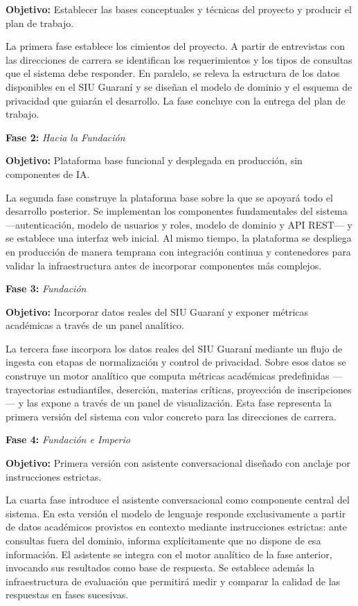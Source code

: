 \documentclass[
  spanish,
]{article}
\begin{document}
\textbf{Objetivo:} Establecer las bases conceptuales y técnicas del proyecto y producir el plan de trabajo.

La primera fase establece los cimientos del proyecto. A partir de entrevistas con las direcciones de carrera
se identifican los requerimientos y los tipos de consultas que el sistema debe responder.
En paralelo, se releva la estructura de los datos disponibles en el SIU Guaraní y se diseñan
el modelo de dominio y el esquema de privacidad que guiarán el desarrollo.
La fase concluye con la entrega del plan de trabajo.

\textbf{Fase 2:} \emph{Hacia la Fundación}

\textbf{Objetivo:} Plataforma base funcional y desplegada en producción, sin componentes de IA.

La segunda fase construye la plataforma base sobre la que se apoyará todo el desarrollo posterior.
Se implementan los componentes fundamentales del sistema ---autenticación, modelo de usuarios y roles,
modelo de dominio y API REST--- y se establece una interfaz web inicial.
Al mismo tiempo, la plataforma se despliega en producción de manera temprana con integración continua
y contenedores para validar la infraestructura antes de incorporar componentes más complejos.

\textbf{Fase 3:} \emph{Fundación}

\textbf{Objetivo:} Incorporar datos reales del SIU Guaraní y exponer métricas académicas a través de un panel analítico.

La tercera fase incorpora los datos reales del SIU Guaraní mediante un flujo de ingesta
con etapas de normalización y control de privacidad.
Sobre esos datos se construye un motor analítico que computa métricas académicas predefinidas
---trayectorias estudiantiles, deserción, materias críticas, proyección de inscripciones---
y las expone a través de un panel de visualización.
Esta fase representa la primera versión del sistema con valor concreto para las direcciones de carrera.

\textbf{Fase 4:} \emph{Fundación e Imperio}

\textbf{Objetivo:} Primera versión con asistente conversacional diseñado con anclaje por instrucciones estrictas.

La cuarta fase introduce el asistente conversacional como componente central del sistema.
En esta versión el modelo de lenguaje responde exclusivamente a partir de datos académicos
provistos en contexto mediante instrucciones estrictas: ante consultas fuera del dominio,
informa explícitamente que no dispone de esa información.
El asistente se integra con el motor analítico de la fase anterior, invocando sus resultados como base de respuesta.
Se establece además la infraestructura de evaluación que permitirá medir y comparar
la calidad de las respuestas en fases sucesivas.
\end{document}
